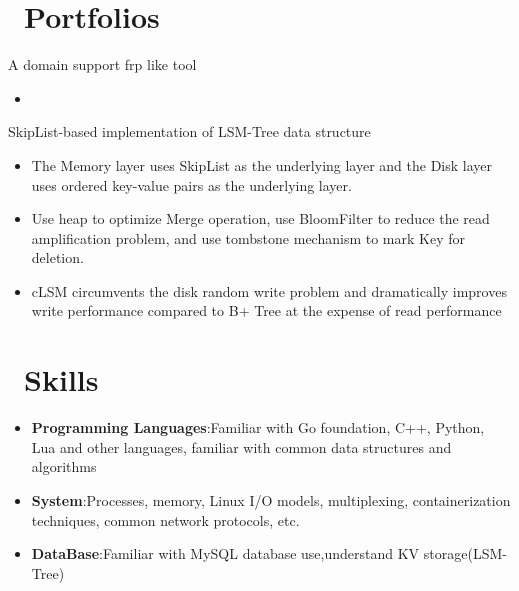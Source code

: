 \documentclass{resume}
\newcommand{\en}[1]{#1}
\newcommand{\zh}[1]{}
\begin{document}
\section{\faGithubAlt\ \en{Portfolios}\zh{个人项目}}
\en{A domain support frp like tool}
\zh{支持子域的内网转发工具}
\begin{itemize}[parsep=0.5ex]
      \item \en{}
            \zh{使用 Go 实现,支持 TCP 协议,支持 Domain 配置}
\end{itemize}

\en{SkipList-based implementation of LSM-Tree data structure}
\zh{基于 SkipList 的 LSM-Tree 数据结构实现}
\begin{itemize}[parsep=0.5ex]
      \item \en{The Memory layer uses SkipList as the underlying layer and the Disk layer uses ordered key-value pairs as the underlying layer.}
            \zh{Memory 层采用 SkipList 作为底层,Disk 层使用有序键值对作为底层}
      \item \en{Use heap to optimize Merge operation, use BloomFilter to reduce the read amplification problem, and use tombstone mechanism to mark Key for deletion.}
            \zh{利用堆优化 Merge 操作,利用 BloomFilter 降低读放大问题,删除采用墓碑机制标记 Key}
      \item \en{cLSM circumvents the disk random write problem and dramatically improves write performance compared to B+ Tree at the expense of read performance}
            \zh{cLSM 规避磁盘随机写入问题,相比 B+ Tree 牺牲读性能,大幅提高写性能}
\end{itemize}

\section{\faCogs\ \en{Skills}\zh{技能}}
\begin{itemize}[parsep=0.5ex]
      \item \en{\textbf{Programming Languages}:Familiar with Go foundation, C++, Python, Lua and other languages, familiar with common data structures and algorithms}
            \zh{\textbf{编程语言}: 熟悉 Go 基础,了解 C++、Python、Lua 等语言,熟悉常用数据结构与算法}
      \item \en{\textbf{System}:Processes, memory, Linux I/O models, multiplexing, containerization techniques, common network protocols, etc.}
            \zh{\textbf{系统}: 进程、内存、Linux I/O 模型、多路复用、容器化技术、常见网络协议等}
      \item \en{\textbf{DataBase}:Familiar with MySQL database use,understand KV storage(LSM-Tree)}
            \zh{\textbf{数据库}: 熟悉 MySQL 数据库使用,了解 KV 存储(LSM-Tree)}
\end{itemize}
\end{document}
